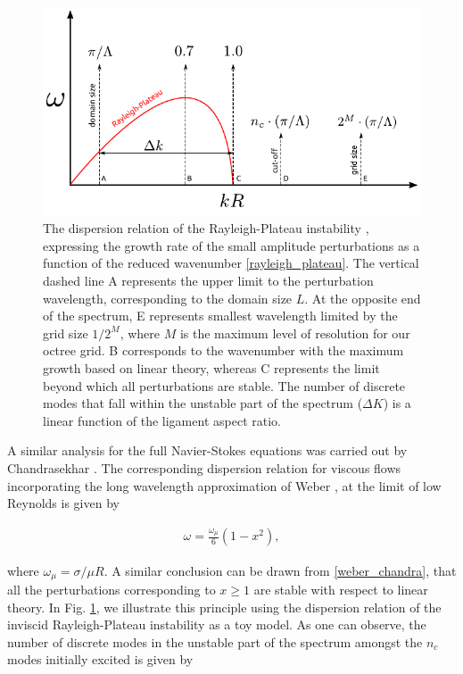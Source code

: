 \begin{figure}
\centering
\includegraphics{plots/ligament_breakup/wave_quant.pdf}
\caption{ The dispersion relation of the Rayleigh-Plateau instability 
	\cite{rayleigh1879a, plateau1849}, expressing the growth rate of 
	the small amplitude perturbations as a function of 
	the reduced wavenumber \eqref{rayleigh_plateau}.
	The vertical dashed line A represents the upper limit
	to the perturbation wavelength, corresponding to the domain size $L$. 
	At the opposite end of the spectrum, E represents smallest wavelength  
        limited by the grid size $1/2^M$, where $M$ is the maximum level of 
	resolution for our octree grid. B corresponds to the wavenumber with 
	the maximum growth based on linear theory, whereas C represents the limit
	beyond which all perturbations are stable. The number of discrete modes
	that fall within the unstable part of the spectrum ($\Delta K$) 
	is a linear function of the ligament aspect ratio. 
	}
\label{quant}
\end{figure}

A similar analysis for the full Navier-Stokes equations 
was carried out by Chandrasekhar \cite{chandra}. 
The corresponding dispersion relation for viscous 
flows incorporating the long wavelength approximation 
of Weber \cite{weber1931}, at the limit of low Reynolds is given by

\begin{align}
\omega = \frac{\omega_\mu}{6}\left(1 - x^2 \right) , 
\label{weber_chandra}
\end{align}

where $\omega_\mu = \sigma / \mu R $. 
A similar conclusion can be drawn from \eqref{weber_chandra},
that all the perturbations corresponding to $x \geq 1 $ are 
stable with respect to linear theory. 
\marginnote{
}
In Fig. \ref{quant}, we illustrate this principle using the dispersion 
relation of the inviscid Rayleigh-Plateau instability as a toy model. 
As one can observe, the number of discrete modes in the unstable part
of the spectrum amongst the $n_c$ modes initially excited is given by 

